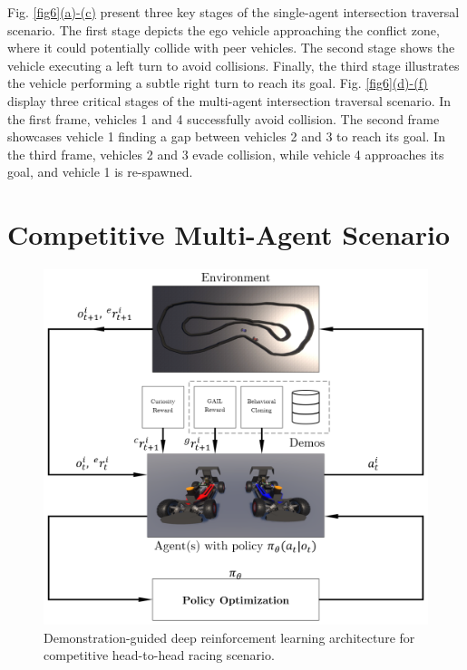 \documentclass[letterpaper, 10 pt, conference]{ieeeconf}  %
\begin{document}
	Fig. \hyperref[fig6]{\ref*{fig6}(a)-(c)} present three key stages of the single-agent intersection traversal scenario. The first stage depicts the ego vehicle approaching the conflict zone, where it could potentially collide with peer vehicles. The second stage shows the vehicle executing a left turn to avoid collisions. Finally, the third stage illustrates the vehicle performing a subtle right turn to reach its goal. Fig. \hyperref[fig6]{\ref*{fig6}(d)-(f)} display three critical stages of the multi-agent intersection traversal scenario. In the first frame, vehicles 1 and 4 successfully avoid collision. The second frame showcases vehicle 1 finding a gap between vehicles 2 and 3 to reach its goal. In the third frame, vehicles 2 and 3 evade collision, while vehicle 4 approaches its goal, and vehicle 1 is re-spawned.
	
	
	\section{Competitive Multi-Agent Scenario}
	\label{Section: Competitive Multi-Agent Scenario}
	
	\begin{figure}[ht]
		\centering
		\includegraphics[width=\linewidth]{Fig8.png}
		\caption{Demonstration-guided deep reinforcement learning architecture for competitive head-to-head racing scenario.}
		\label{fig8}
	\end{figure}
	
\end{document}
